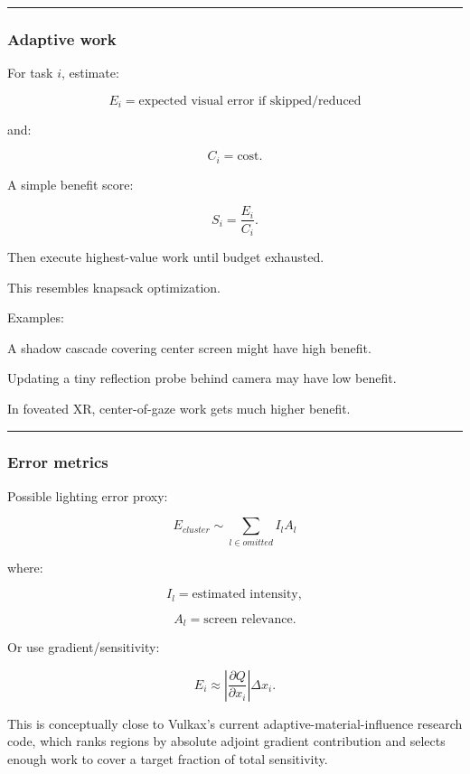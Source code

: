 \begin{center}\rule{0.5\linewidth}{0.5pt}\end{center}

\subsubsection{Adaptive work}\label{adaptive-work}

For task \(i\), estimate:

\[
E_i=
\text{expected visual error if skipped/reduced}
\]

and:

\[
C_i=
\text{cost}.
\]

A simple benefit score:

\[
\boxed{
S_i=
\frac{E_i}{C_i}.
}
\]

Then execute highest-value work until budget exhausted.

This resembles knapsack optimization.

Examples:

A shadow cascade covering center screen might have high benefit.

Updating a tiny reflection probe behind camera may have low benefit.

In foveated XR, center-of-gaze work gets much higher benefit.

\begin{center}\rule{0.5\linewidth}{0.5pt}\end{center}

\subsubsection{Error metrics}\label{error-metrics}

Possible lighting error proxy:

\[
E_{cluster}
\sim
\sum_{l\in omitted}
I_l
A_l
\]

where:

\[
I_l=\text{estimated intensity},
\]

\[
A_l=\text{screen relevance}.
\]

Or use gradient/sensitivity:

\[
E_i
\approx
\left|
\frac{\partial Q}{\partial x_i}
\right|
\Delta x_i.
\]

This is conceptually close to Vulkax's current adaptive-material-influence research code, which ranks regions by absolute adjoint gradient contribution and selects enough work to cover a target fraction of total sensitivity.

